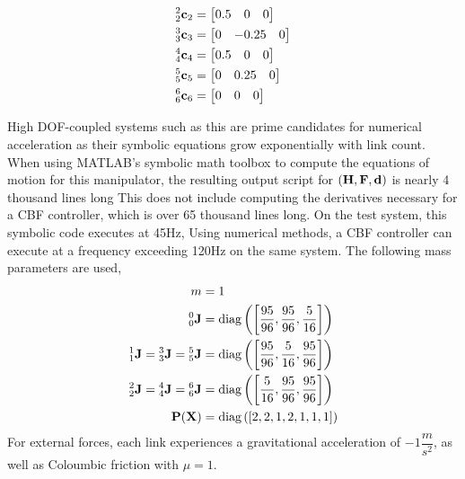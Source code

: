 \begin{align*}
\begin{split}
        {^2_2 \mathbf{c}_2} &= \begin{bmatrix} 0.5& 0& 0 \end{bmatrix}\\
        {^3_3 \mathbf{c} _3} &= \begin{bmatrix} 0& -0.25& 0\end{bmatrix}\\
        {^4_4 \mathbf{c} _4} &= \begin{bmatrix} 0.5& 0& 0 \end{bmatrix}\\
        {^5_5 \mathbf{c} _5} &= \begin{bmatrix} 0 & 0.25 & 0\end{bmatrix}\\
        {^6_6 \mathbf{c} _6} &= \begin{bmatrix} 0 & 0 & 0\end{bmatrix}\\
    \end{split}
\end{align*}

High DOF-coupled systems such as this are prime candidates for numerical acceleration as their symbolic equations grow exponentially with link count. When using MATLAB's symbolic math toolbox to compute the equations of motion for this manipulator, the resulting output script for $({\mathbf{H}}, {\mathbf{F}}, {\mathbf{d}})$ is nearly 4 thousand lines long This does not include computing the derivatives necessary for a CBF controller, which is over 65 thousand lines long. On the test system, this symbolic code executes at 45Hz,  Using numerical methods, a CBF controller can execute at a frequency exceeding 120Hz on the same system. \newline
\noindent The following mass parameters are used,
\begin{align*}
    m &= 1\\
    {^0_0}\mathbf{J} &=  \text{diag}\left (\left [\dfrac{95}{96}, \dfrac{95}{96},  \dfrac{5}{16} \right ] \right )\\
    {^1_1}\mathbf{J} = {^3_3}\mathbf{J} = {^5_5}\mathbf{J} &=  \text{diag}\left (\left [ \dfrac{95}{96}, \dfrac{5}{16}, \dfrac{95}{96} \right ]\right ) \\
    {^2_2}\mathbf{J} = {^4_4}\mathbf{J} = {^6_6}\mathbf{J} &=  \text{diag}\left (\left [ \dfrac{5}{16}, \dfrac{95}{96}, \dfrac{95}{96} \right ]\right ) \\
    \mathbf{P}(\mathbf{X}) &= \text{diag} \left (\left [2, 2, 1, 2, 1, 1, 1 \right] \right )
\end{align*}
\noindent For external forces,  each link experiences a gravitational acceleration of $-1 \dfrac{m}{s^2}$, as well as Coloumbic friction with $\mu = 1$. \newline


